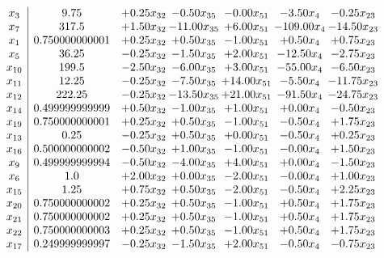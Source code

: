 \documentclass[8pt]{article}
\begin{document}
\[\begin{array}{c| c c@{\hskip 2pt} c@{\hskip 2pt} c@{\hskip 2pt} c@{\hskip 2pt} c@{\hskip 2pt} }
 x_{3}   &  9.75 & +  0.25 x_{32} & -0.50 x_{35} & -0.00 x_{51} & -3.50 x_{4} & -0.25 x_{23}\\
 x_{7}   &  317.5 & +  1.50 x_{32} & -11.00 x_{35} & +  6.00 x_{51} & -109.00 x_{4} & -14.50 x_{23}\\
 x_{1}   &  0.750000000001 & +  0.25 x_{32} & +  0.50 x_{35} & -1.00 x_{51} & +  0.50 x_{4} & +  0.75 x_{23}\\
 x_{5}   &  36.25 & -0.25 x_{32} & -1.50 x_{35} & +  2.00 x_{51} & -12.50 x_{4} & -2.75 x_{23}\\
 x_{10}   &  199.5 & -2.50 x_{32} & -6.00 x_{35} & +  3.00 x_{51} & -55.00 x_{4} & -6.50 x_{23}\\
 x_{11}   &  12.25 & -0.25 x_{32} & -7.50 x_{35} & + 14.00 x_{51} & -5.50 x_{4} & -11.75 x_{23}\\
 x_{12}   &  222.25 & -0.25 x_{32} & -13.50 x_{35} & + 21.00 x_{51} & -91.50 x_{4} & -24.75 x_{23}\\
 x_{14}   &  0.499999999999 & +  0.50 x_{32} & -1.00 x_{35} & +  1.00 x_{51} & +  0.00 x_{4} & -0.50 x_{23}\\
 x_{19}   &  0.750000000001 & +  0.25 x_{32} & +  0.50 x_{35} & -1.00 x_{51} & -0.50 x_{4} & +  1.75 x_{23}\\
 x_{13}   &  0.25 & -0.25 x_{32} & +  0.50 x_{35} & +  0.00 x_{51} & -0.50 x_{4} & +  0.25 x_{23}\\
 x_{16}   &  0.500000000002 & -0.50 x_{32} & +  1.00 x_{35} & -1.00 x_{51} & -0.00 x_{4} & +  1.50 x_{23}\\
 x_{9}   &  0.499999999994 & -0.50 x_{32} & -4.00 x_{35} & +  4.00 x_{51} & +  0.00 x_{4} & -1.50 x_{23}\\
 x_{6}   &  1.0 & +  2.00 x_{32} & +  0.00 x_{35} & -2.00 x_{51} & -0.00 x_{4} & +  1.00 x_{23}\\
 x_{15}   &  1.25 & +  0.75 x_{32} & +  0.50 x_{35} & -2.00 x_{51} & -0.50 x_{4} & +  2.25 x_{23}\\
 x_{20}   &  0.750000000002 & +  0.25 x_{32} & +  0.50 x_{35} & -1.00 x_{51} & +  0.50 x_{4} & +  1.75 x_{23}\\
 x_{21}   &  0.750000000002 & +  0.25 x_{32} & +  0.50 x_{35} & -1.00 x_{51} & +  0.50 x_{4} & +  1.75 x_{23}\\
 x_{22}   &  0.750000000003 & +  0.25 x_{32} & +  0.50 x_{35} & -1.00 x_{51} & +  0.50 x_{4} & +  1.75 x_{23}\\
 x_{17}   &  0.249999999997 & -0.25 x_{32} & -1.50 x_{35} & +  2.00 x_{51} & -0.50 x_{4} & -0.75 x_{23}\\

\end{array}\]
\end{document}
